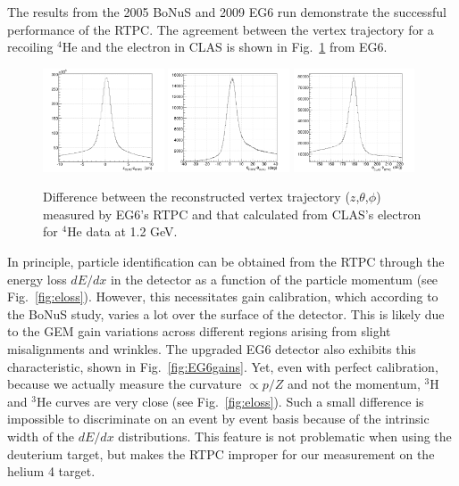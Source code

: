 The results from the 2005 BoNuS and 2009 EG6 run demonstrate the successful performance of the RTPC.
The agreement between the vertex trajectory for a recoiling $^4$He and the electron in CLAS is shown in Fig.~\ref{fig:EG6elastic_delta} from EG6.  

\begin{figure}
  \begin{center}
    \includegraphics[angle=0, width=0.32\textwidth]{./../Detector/fig-chap2/eg6elastic_dz_small}
    \includegraphics[angle=0, width=0.32\textwidth]{./../Detector/fig-chap2/eg6elastic_dthe_small}
    \includegraphics[angle=0, width=0.32\textwidth]{./../Detector/fig-chap2/eg6elastic_dphi_small}
    \caption{Difference between the reconstructed vertex trajectory ($z$,$\theta$,$\phi$) measured by EG6's RTPC and that calculated from CLAS's electron for $^4$He data at 1.2 GeV.\label{fig:EG6elastic_delta}}
  \end{center}
\end{figure}

In principle, particle identification can be obtained from the RTPC through the energy loss $dE/dx$ in the detector as a function of the particle momentum (see Fig.~\ref{fig:eloss}). However, this necessitates gain calibration, which according to the BoNuS study, varies a lot over the surface of the detector. This is likely due to the GEM gain variations across different regions arising from slight misalignments and wrinkles. The upgraded EG6 detector also exhibits this characteristic, shown in Fig.~\ref{fig:EG6gains}. Yet, even with perfect calibration, because we actually measure the curvature $\propto p/Z$ and not the momentum, $^3$H and $^3$He curves are very close (see Fig.~\ref{fig:eloss}). Such a small difference is impossible to discriminate on an event by event basis because of the intrinsic width of the $dE/dx$ distributions. This feature is not problematic when using the deuterium target, but makes the RTPC improper for our measurement on the helium 4 target.

